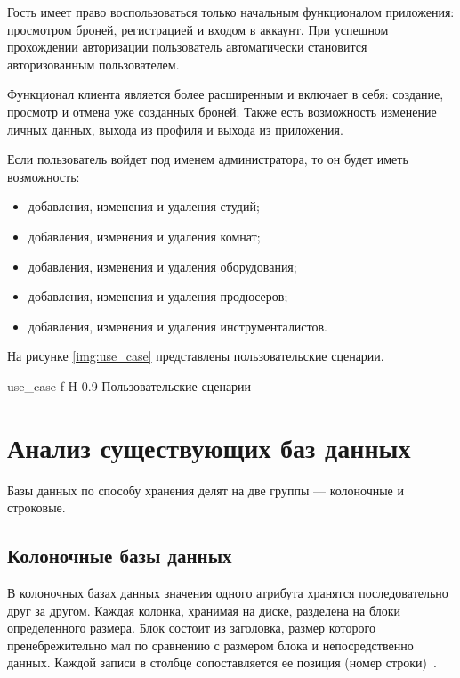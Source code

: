 Гость имеет право воспользоваться только начальным функционалом приложения: просмотром броней, регистрацией и входом в аккаунт.
При успешном прохождении авторизации пользователь автоматически становится авторизованным пользователем.

Функционал клиента является более расширенным и включает в себя: создание, просмотр и отмена уже созданных броней. 
Также есть возможность изменение личных данных, выхода из профиля и выхода из приложения.

Если пользователь войдет под именем администратора, то он будет иметь возможность:
\begin{itemize}
	\item добавления, изменения и удаления студий;
	\item добавления, изменения и удаления комнат;
	\item добавления, изменения и удаления оборудования;
	\item добавления, изменения и удаления продюсеров;
	\item добавления, изменения и удаления инструменталистов.
\end{itemize}
		
На рисунке \ref{img:use_case} представлены пользовательские сценарии.


{use_case} %
{f} %
{H} %
{0.9\textwidth} %
{Пользовательские сценарии} %



\section{Анализ существующих баз данных}
Базы данных по способу хранения делят на две группы --- колоночные и строковые.

\subsection{Колоночные базы данных}
В колоночных базах данных значения одного атрибута хранятся последовательно друг за другом.
Каждая колонка, хранимая на диске, разделена на блоки определенного размера.
Блок состоит из заголовка, размер которого пренебрежительно мал по сравнению с размером блока и непосредственно данных.
Каждой записи в столбце сопоставляется ее позиция (номер строки)~\cite{strokovie_and_kolonochnie_bd}.
